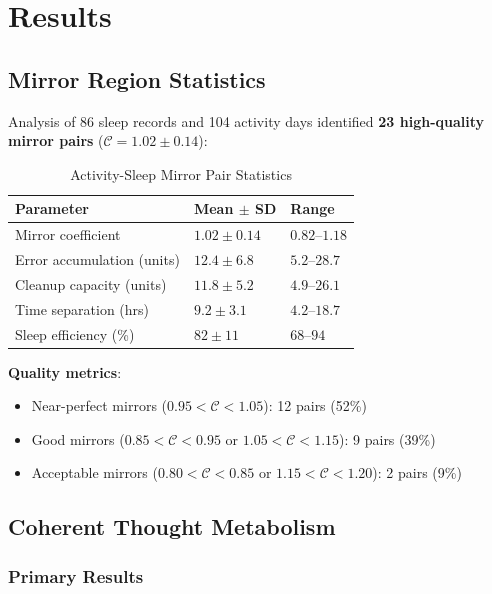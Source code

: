 \documentclass[12pt]{article}
\theoremstyle{remark}
\begin{document}
\section{Results}

\subsection{Mirror Region Statistics}

Analysis of 86 sleep records and 104 activity days identified \textbf{23 high-quality mirror pairs} ($\mathcal{C} = 1.02 \pm 0.14$):

\begin{table}[H]
\centering
\caption{Activity-Sleep Mirror Pair Statistics}
\begin{tabular}{@{}lll@{}}
\toprule
\textbf{Parameter} & \textbf{Mean $\pm$ SD} & \textbf{Range} \\
\midrule
Mirror coefficient & $1.02 \pm 0.14$ & $0.82$--$1.18$ \\
Error accumulation (units) & $12.4 \pm 6.8$ & $5.2$--$28.7$ \\
Cleanup capacity (units) & $11.8 \pm 5.2$ & $4.9$--$26.1$ \\
Time separation (hrs) & $9.2 \pm 3.1$ & $4.2$--$18.7$ \\
Sleep efficiency (\%) & $82 \pm 11$ & $68$--$94$ \\
\bottomrule
\end{tabular}
\end{table}

\textbf{Quality metrics}:
\begin{itemize}
\item Near-perfect mirrors ($0.95 < \mathcal{C} < 1.05$): 12 pairs (52\%)
\item Good mirrors ($0.85 < \mathcal{C} < 0.95$ or $1.05 < \mathcal{C} < 1.15$): 9 pairs (39\%)
\item Acceptable mirrors ($0.80 < \mathcal{C} < 0.85$ or $1.15 < \mathcal{C} < 1.20$): 2 pairs (9\%)
\end{itemize}

\subsection{Coherent Thought Metabolism}

\subsubsection{Primary Results}
\end{document}
